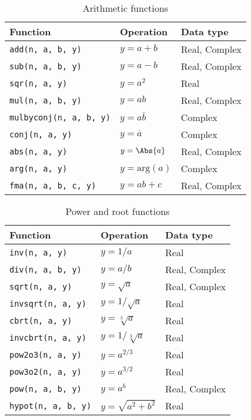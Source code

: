 \begin{table}
  \begin{tabularx}{\textwidth}{LLL}
    \toprule
    Function & Operation & Data type \\
    \midrule
    \texttt{add(n, a, b, y)}       & $y = a + b$           & Real, Complex \\
    \texttt{sub(n, a, b, y)}       & $y = a - b$           & Real, Complex \\
    \texttt{sqr(n, a, y)}          & $y = a^2$             & Real          \\
    \texttt{mul(n, a, b, y)}       & $y = ab$              & Real, Complex \\
    \texttt{mulbyconj(n, a, b, y)} & $y = a\bar{b}$        & Complex       \\
    \texttt{conj(n, a, y)}         & $y = \bar{a}$         & Complex       \\
    \texttt{abs(n, a, y)}          & $y = \Abs{a}$         & Real, Complex \\
    \texttt{arg(n, a, y)}          & $y = \mathrm{arg}(a)$ & Complex       \\
    \texttt{fma(n, a, b, c, y)}    & $y = ab + c$          & Real, Complex \\
    \bottomrule
  \end{tabularx}
  \caption{Arithmetic functions}
  \label{tab:Arithmetic functions}
\end{table}

\begin{table}
  \begin{tabularx}{\textwidth}{LLL}
    \toprule
    Function & Operation & Data type \\
    \midrule
    \texttt{inv(n, a, y)}      & $y = 1 / a$            & Real          \\
    \texttt{div(n, a, b, y)}   & $y = a / b$            & Real, Complex \\
    \texttt{sqrt(n, a, y)}     & $y = \sqrt{a}$         & Real, Complex \\
    \texttt{invsqrt(n, a, y)}  & $y = 1 / \sqrt{a}$     & Real          \\
    \texttt{cbrt(n, a, y)}     & $y = \sqrt[3]{a}$      & Real          \\
    \texttt{invcbrt(n, a, y)}  & $y = 1 / \sqrt[3]{a}$  & Real          \\
    \texttt{pow2o3(n, a, y)}   & $y = a^{2/3}$          & Real          \\
    \texttt{pow3o2(n, a, y)}   & $y = a^{3/2}$          & Real          \\
    \texttt{pow(n, a, b, y)}   & $y = a^b$              & Real, Complex \\
    \texttt{hypot(n, a, b, y)} & $y = \sqrt{a^2 + b^2}$ & Real          \\
    \bottomrule
  \end{tabularx}
  \caption{Power and root functions}
  \label{tab:Power and root functions}
\end{table}

